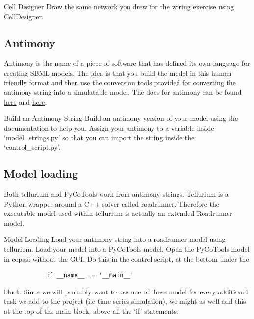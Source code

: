 \documentclass[../../main]{subfiles}
\begin{document}
    \begin{Task}[label=CellDesigner]{Cell Designer}
        Draw the same network you drew for the wiring exercise using CellDesigner.
    \end{Task}

    \subsection{Antimony}
    Antimony is the name of a piece of software that has defined its own language for creating SBML models.
    The idea is that you build the model in this human-friendly format and then use the conversion tools
    provided for converting the antimony string into a simulatable model. The docs for antimony can be
    found \href{https://tellurium.readthedocs.io/en/latest/antimony.html}{here} and \href{http://tellurium.analogmachine.org/antimony-tutorial/}{here}.

    \begin{Task}[label=AntimonyString]{Build an Antimony String}
        Build an antimony version of your model using the documentation to help you.
        Assign your antimony to a variable inside `model\_strings.py' so that you can import the
        string inside the `control\_script.py'.
    \end{Task}

    \subsection{Model loading}
    Both tellurium and PyCoTools work from antimony strings. Tellurium is a Python wrapper around
    a C++ solver called roadrunner. Therefore the executable model used within tellurium is actually
    an extended Roadrunner model.


    \begin{Task}[label=ModelLoading]{Model Loading}
        Load your antimony string into a roadrunner model using tellurium. Load your model into
        a PyCoTools model. Open the PyCoTools model in copasi without the GUI. Do this in the control script,
        at the bottom under the
        \begin{verbatim}
            if __name__ == '__main__'
        \end{verbatim} block.
        Since we will probably want to use one of these model for every additional task we add to the project (i.e
        time series simulation), we might as well add this at the top of the main block, above all the `if' statements.
    \end{Task}
\end{document}
